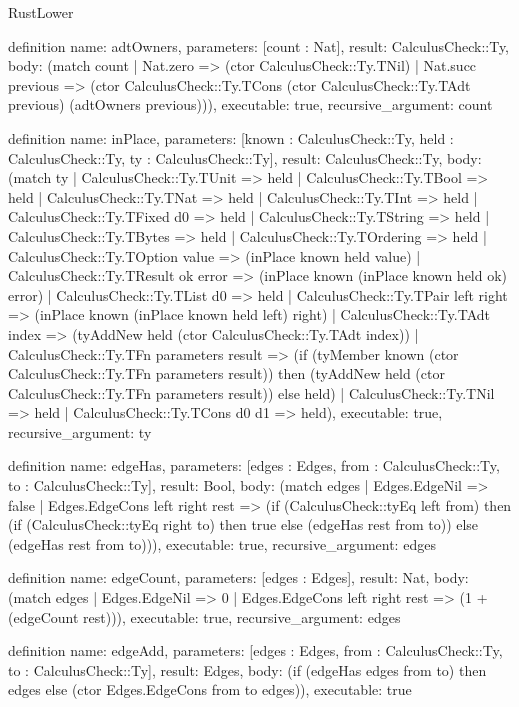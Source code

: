 \begin{lexlean}{RustLower}
\begin{semanticmodule}
definition{
  name: adtOwners,
  parameters: [count : Nat],
  result: CalculusCheck::Ty,
  body: (match count
    | Nat.zero => (ctor CalculusCheck::Ty.TNil)
    | Nat.succ previous => (ctor CalculusCheck::Ty.TCons (ctor CalculusCheck::Ty.TAdt previous) (adtOwners previous))),
  executable: true,
  recursive_argument: count
}

definition{
  name: inPlace,
  parameters: [known : CalculusCheck::Ty, held : CalculusCheck::Ty, ty : CalculusCheck::Ty],
  result: CalculusCheck::Ty,
  body: (match ty
    | CalculusCheck::Ty.TUnit => held
    | CalculusCheck::Ty.TBool => held
    | CalculusCheck::Ty.TNat => held
    | CalculusCheck::Ty.TInt => held
    | CalculusCheck::Ty.TFixed d0 => held
    | CalculusCheck::Ty.TString => held
    | CalculusCheck::Ty.TBytes => held
    | CalculusCheck::Ty.TOrdering => held
    | CalculusCheck::Ty.TOption value => (inPlace known held value)
    | CalculusCheck::Ty.TResult ok error => (inPlace known (inPlace known held ok) error)
    | CalculusCheck::Ty.TList d0 => held
    | CalculusCheck::Ty.TPair left right => (inPlace known (inPlace known held left) right)
    | CalculusCheck::Ty.TAdt index => (tyAddNew held (ctor CalculusCheck::Ty.TAdt index))
    | CalculusCheck::Ty.TFn parameters result => (if (tyMember known (ctor CalculusCheck::Ty.TFn parameters result)) then (tyAddNew held (ctor CalculusCheck::Ty.TFn parameters result)) else held)
    | CalculusCheck::Ty.TNil => held
    | CalculusCheck::Ty.TCons d0 d1 => held),
  executable: true,
  recursive_argument: ty
}

definition{
  name: edgeHas,
  parameters: [edges : Edges, from : CalculusCheck::Ty, to : CalculusCheck::Ty],
  result: Bool,
  body: (match edges
    | Edges.EdgeNil => false
    | Edges.EdgeCons left right rest => (if (CalculusCheck::tyEq left from) then (if (CalculusCheck::tyEq right to) then true else (edgeHas rest from to)) else (edgeHas rest from to))),
  executable: true,
  recursive_argument: edges
}

definition{
  name: edgeCount,
  parameters: [edges : Edges],
  result: Nat,
  body: (match edges
    | Edges.EdgeNil => 0
    | Edges.EdgeCons left right rest => (1 + (edgeCount rest))),
  executable: true,
  recursive_argument: edges
}

definition{
  name: edgeAdd,
  parameters: [edges : Edges, from : CalculusCheck::Ty, to : CalculusCheck::Ty],
  result: Edges,
  body: (if (edgeHas edges from to) then edges else (ctor Edges.EdgeCons from to edges)),
  executable: true
}


\end{semanticmodule}
\end{lexlean}
